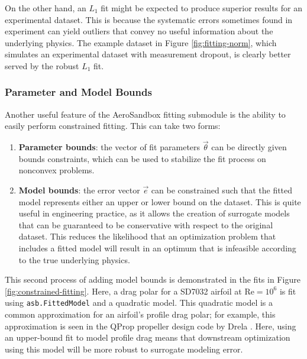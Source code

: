 On the other hand, an $L_1$ fit might be expected to produce superior results for an experimental dataset. This is because the systematic errors sometimes found in experiment can yield outliers that convey no useful information about the underlying physics. The example dataset in Figure \ref{fig:fitting-norm}, which simulates an experimental dataset with measurement dropout, is clearly better served by the robust $L_1$ fit.



\subsubsection{Parameter and Model Bounds}

Another useful feature of the AeroSandbox fitting submodule is the ability to easily perform constrained fitting. This can take two forms:

\begin{enumerate}
    \item \textbf{Parameter bounds}: the vector of fit parameters $\vec{\theta}$ can be directly given bounds constraints, which can be used to stabilize the fit process on nonconvex problems.
    \item \textbf{Model bounds}: the error vector $\vec{e}$ can be constrained such that the fitted model represents either an upper or lower bound on the dataset. This is quite useful in engineering practice, as it allows the creation of surrogate models that can be guaranteed to be conservative with respect to the original dataset. This reduces the likelihood that an optimization problem that includes a fitted model will result in an optimum that is infeasible according to the true underlying physics.
\end{enumerate}

This second process of adding model bounds is demonstrated in the fits in Figure \ref{fig:constrained-fitting}. Here, a drag polar for a SD7032 airfoil at $\text{Re}=10^6$ is fit using \texttt{asb.FittedModel} and a quadratic model. This quadratic model is a common approximation for an airfoil's profile drag polar; for example, this approximation is seen in the QProp propeller design code by Drela \cite{qprop}. Here, using an upper-bound fit to model profile drag means that downstream optimization using this model will be more robust to surrogate modeling error.


